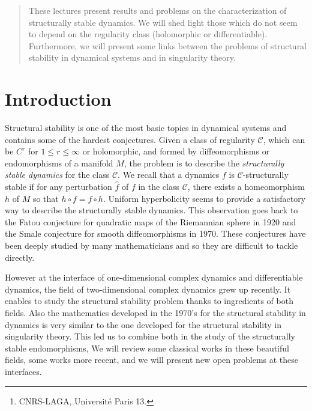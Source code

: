 \documentclass[11pt,openany,leqno]{article}
\begin{document}
\author{Pierre Berger\footnote{CNRS-LAGA, Université Paris 13.}}

\date{}

\maketitle

\begin{abstract} 
These lectures  present  results and problems on the characterization of structurally stable dynamics. 
We will shed light those which do not seem to  depend on the regularity class (holomorphic or differentiable).
Furthermore, we will present some links between the problems of structural stability in dynamical systems and in singularity theory. 
\end{abstract}
\tableofcontents

\section*{Introduction}

Structural stability is one of the most basic topics in dynamical systems and contains some of the hardest conjectures.
  Given a class of regularity $\mathcal C$, which can be $C^r$ for $1\le r\le \infty$ or holomorphic, and formed by diffeomorphisms or endomorphisms of a manifold $M$, the problem is to describe the \emph{structurally stable dynamics} for the class $\mathcal C$. We recall that a dynamics $f$ is $\mathcal C$-structurally stable if for any perturbation $\hat f$ of $f$ in the class $\mathcal C$, there exists a homeomorphism $h$ of $M$ so that $h\circ f= f\circ h$.  
Uniform hyperbolicity seems to provide a satisfactory way to describe the structurally stable dynamics. This observation goes back to the Fatou conjecture for quadratic maps of the Riemannian sphere in 1920 and the Smale conjecture for smooth diffeomorphisms in 1970. These conjectures have been deeply studied by many mathematicians and so they are difficult to tackle directly. 

However at the interface of one-dimensional complex dynamics and differentiable dynamics, the field of two-dimensional complex dynamics  grew up recently. It enables to study the structural stability problem thanks to ingredients of both  fields. 
Also the mathematics  developed in the 1970's for the structural stability in dynamics is very similar to the one developed for the structural stability in singularity theory. This led us to combine both in the study of the structurally stable endomorphisms,  
We will review some classical works  in these beautiful fields,  some works more recent,   and we will present  new open problems at these interfaces.
\end{document}
